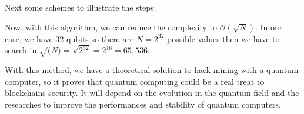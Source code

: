 Next some schemes to illustrate the steps:

\clearpage

\begin{figure}[ht]
\centering

\hspace{1cm}
\end{figure}
\medskip

\begin{figure}[ht]
\centering

\hspace{1cm}
\end{figure}
\medskip

Now, with this algorithm, we can reduce the complexity to $\mathcal{O}(\sqrt{N})$. In our case, we have 32 qubits so there are $N = 2^{32}$ possible values then we have to search in $\sqrt(N) = \sqrt{2^{32}} = 2^{16} = 65,536$. \newline

With this method, we have a theoretical solution to hack mining with a quantum computer, so it proves that quantum computing could be a real treat to blockchains security. It will depend on the evolution in the quantum field and the researches to improve the performances and stability of quantum computers.
